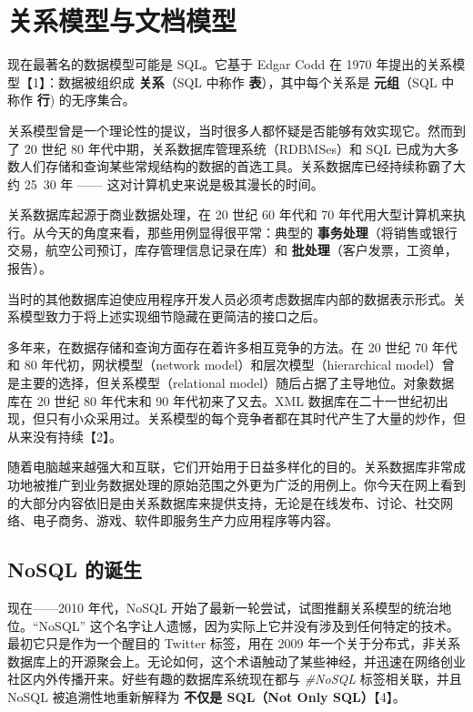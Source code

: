 \section{关系模型与文档模型}

现在最著名的数据模型可能是 SQL。它基于 Edgar Codd 在 1970 年提出的关系模型【1】：数据被组织成 \textbf{关系}（SQL 中称作 \textbf{表}），其中每个关系是 \textbf{元组}（SQL 中称作 \textbf{行}) 的无序集合。

关系模型曾是一个理论性的提议，当时很多人都怀疑是否能够有效实现它。然而到了 20 世纪 80 年代中期，关系数据库管理系统（RDBMSes）和 SQL 已成为大多数人们存储和查询某些常规结构的数据的首选工具。关系数据库已经持续称霸了大约 25~30 年 —— 这对计算机史来说是极其漫长的时间。

关系数据库起源于商业数据处理，在 20 世纪 60 年代和 70 年代用大型计算机来执行。从今天的角度来看，那些用例显得很平常：典型的 \textbf{事务处理}（将销售或银行交易，航空公司预订，库存管理信息记录在库）和 \textbf{批处理}（客户发票，工资单，报告）。

当时的其他数据库迫使应用程序开发人员必须考虑数据库内部的数据表示形式。关系模型致力于将上述实现细节隐藏在更简洁的接口之后。

多年来，在数据存储和查询方面存在着许多相互竞争的方法。在 20 世纪 70 年代和 80 年代初，网状模型（network model）和层次模型（hierarchical model）曾是主要的选择，但关系模型（relational model）随后占据了主导地位。对象数据库在 20 世纪 80 年代末和 90 年代初来了又去。XML 数据库在二十一世纪初出现，但只有小众采用过。关系模型的每个竞争者都在其时代产生了大量的炒作，但从来没有持续【2】。

随着电脑越来越强大和互联，它们开始用于日益多样化的目的。关系数据库非常成功地被推广到业务数据处理的原始范围之外更为广泛的用例上。你今天在网上看到的大部分内容依旧是由关系数据库来提供支持，无论是在线发布、讨论、社交网络、电子商务、游戏、软件即服务生产力应用程序等内容。

\subsection{NoSQL 的诞生}

现在——2010 年代，NoSQL 开始了最新一轮尝试，试图推翻关系模型的统治地位。“NoSQL” 这个名字让人遗憾，因为实际上它并没有涉及到任何特定的技术。最初它只是作为一个醒目的 Twitter 标签，用在 2009 年一个关于分布式，非关系数据库上的开源聚会上。无论如何，这个术语触动了某些神经，并迅速在网络创业社区内外传播开来。好些有趣的数据库系统现在都与 \textit{\#NoSQL} 标签相关联，并且 NoSQL 被追溯性地重新解释为 \textbf{不仅是 SQL（Not Only SQL）}【4】。

